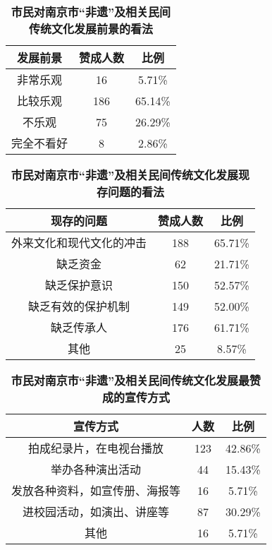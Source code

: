 \documentclass[12pt]{article}%
\begin{document}
\begin{table}[htbp]
  \centering
  \caption{\bf{市民对南京市“非遗”及相关民间传统文化发展前景的看法}}
    \begin{tabular}{ccc}
    \hline
    发展前景  & 赞成人数    & 比例 \\
    \hline
    非常乐观  & 16    & 5.71\% \\
    比较乐观  & 186   & 65.14\% \\
    不乐观   & 75    & 26.29\% \\
    完全不看好 & 8     & 2.86\% \\
    \hline
    \end{tabular}%
\end{table}%



\begin{table}[htbp]
  \centering
  \caption{\bf{市民对南京市“非遗”及相关民间传统文化发展现存问题的看法}}
    \begin{tabular}{ccc}
    \hline
    现存的问题 & 赞成人数    & 比例 \\
    \hline
    外来文化和现代文化的冲击 & 188   & 65.71\% \\
    缺乏资金  & 62    & 21.71\% \\
    缺乏保护意识 & 150   & 52.57\% \\
    缺乏有效的保护机制 & 149   & 52.00\% \\
    缺乏传承人 & 176   & 61.71\% \\
    其他    & 25    & 8.57\% \\
    \hline
    \end{tabular}%
\end{table}%



\begin{table}[htbp]
  \centering
  \caption{\bf{市民对南京市“非遗”及相关民间传统文化发展最赞成的宣传方式}}
    \begin{tabular}{ccc}
    \hline
    宣传方式 & 人数    & 比例 \\
    \hline
    拍成纪录片，在电视台播放 & 123   & 42.86\% \\
    举办各种演出活动 & 44    & 15.43\% \\
    发放各种资料，如宣传册、海报等 & 16    & 5.71\% \\
    进校园活动，如演出、讲座等 & 87    & 30.29\% \\
    其他    & 16    & 5.71\% \\
    \hline
    \end{tabular}%
\end{table}%
\end{document}
